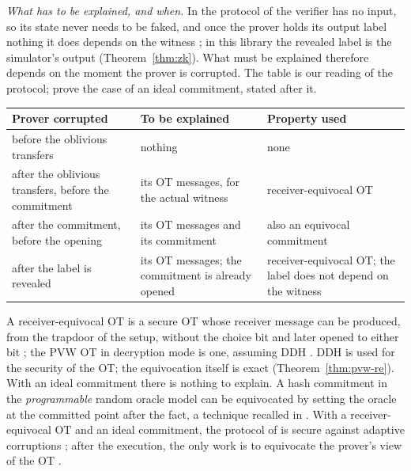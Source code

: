 \emph{What has to be explained, and when.} In the protocol of \cite{JKO13} the verifier has no
input, so its state never needs to be faked, and once the prover holds its output label nothing it
does depends on the witness \cite[Sect.~3.2]{GKPS18}; in this library the revealed label is the
simulator's output (Theorem~\ref{thm:zk}). What must be explained therefore depends on the moment
the prover is corrupted. The table is our reading of the protocol; \cite{GKPS18} prove the case of
an ideal commitment, stated after it.
\begin{center}
\begin{tabular}{|p{}|p{}|p{}|}
  \hline
  \textbf{Prover corrupted} & \textbf{To be explained} & \textbf{Property used} \\
  \hline
  before the oblivious transfers & nothing & none \\
  \hline
  after the oblivious transfers, before the commitment & its OT messages, for the actual witness &
  receiver-equivocal OT \\
  \hline
  after the commitment, before the opening & its OT messages and its commitment & also an equivocal
  commitment \\
  \hline
  after the label is revealed & its OT messages; the commitment is already opened &
  receiver-equivocal OT; the label does not depend on the witness \\
  \hline
\end{tabular}
\end{center}
A receiver-equivocal OT is a secure OT whose receiver message can be produced, from the trapdoor of
the setup, without the choice bit and later opened to either bit
\cite[Sect.~3, Definition~3.1]{GKPS18}; the PVW OT in decryption mode is one, assuming DDH
\cite[Sect.~3.3, Theorem~3.2]{GKPS18}. DDH is used for the security of the OT; the equivocation
itself is exact (Theorem~\ref{thm:pvw-re}). With an ideal commitment there is nothing
to explain. A hash commitment in the \emph{programmable} random oracle model can be equivocated by
setting the oracle at the committed point after the fact, a technique recalled in
\cite[Sect.~1.2]{GKPS18}. With a receiver-equivocal OT and an ideal commitment, the
protocol of \cite{JKO13} is secure against adaptive corruptions \cite[Sect.~3]{GKPS18}; after
the execution, the only work is to equivocate the prover's view of the OT
\cite[Sect.~3.2]{GKPS18}.

